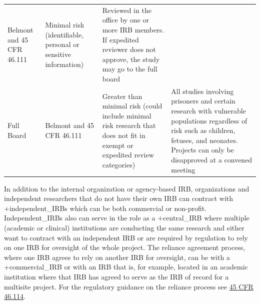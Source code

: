 \documentclass[
]{WileySix}
\begin{document}
\begin{longtable}[]{@{}llll@{}}
\begin{minipage}[t]{0.21\columnwidth}
Belmont and 45
CFR 46.111\strut
\end{minipage} & \begin{minipage}[t]{0.22\columnwidth}\raggedright
Minimal risk
(identifiable,
personal or
sensitive
information)\strut
\end{minipage} & \begin{minipage}[t]{0.28\columnwidth}\raggedright
Reviewed in the
office by one or
more IRB members. If
expedited reviewer
does not approve,
the study may go to
the full board\strut
\end{minipage}\tabularnewline
\begin{minipage}[t]{0.16\columnwidth}\raggedright
Full Board\strut
\end{minipage} & \begin{minipage}[t]{0.21\columnwidth}\raggedright
Belmont and 45
CFR 46.111\strut
\end{minipage} & \begin{minipage}[t]{0.22\columnwidth}\raggedright
Greater than
minimal risk
(could include
minimal risk
research that
does not fit in
exempt or
expedited
review
categories)\strut
\end{minipage} & \begin{minipage}[t]{0.28\columnwidth}\raggedright
All studies
involving prisoners
and certain research
with vulnerable
populations
regardless of risk
such as children,
fetuses, and
neonates. Projects
can only be
disapproved at a
convened meeting\strut
\end{minipage}\tabularnewline
\bottomrule
\end{longtable}

In addition to the internal organization or agency-based IRB, organizations and independent researchers that do not have their own IRB can contract with +independent\_IRBs\textbar{} which can be both commercial or non-profit. Independent\_IRBs also can serve in the role as a +central\_IRB\textbar{} where multiple (academic or clinical) institutions are conducting the same research and either want to contract with an independent IRB or are required by regulation to rely on one IRB for oversight of the whole project. The reliance agreement process, where one IRB agrees to rely on another IRB for oversight, can be with a +commercial\_IRB\textbar{} or with an IRB that is, for example, located in an academic institution where that IRB has agreed to serve as the IRB of record for a multisite project. For the regulatory guidance on the reliance process see \href{https://www.law.cornell.edu/cfr/text/45/46.114}{45 CFR 46.114}.
\end{document}
